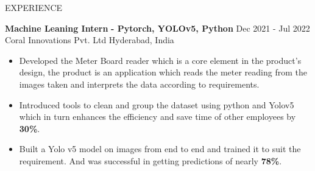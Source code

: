 \documentclass{resume} %
\begin{document}
\begin{rSection}{EXPERIENCE}

\textbf{Machine Leaning Intern} \textbf{- Pytorch, YOLOv5, Python} \hfill Dec 2021 - Jul 2022\\
Coral Innovations Pvt. Ltd  \hfill {Hyderabad, India}
 \begin{itemize}
    \itemsep -6pt {} 
     \item Developed the Meter Board reader which is a core element in the product’s design, the product is an application which reads the meter reading from the images taken and interprets the data according to requirements.
     \item Introduced tools to clean and group the dataset using python and Yolov5 which in turn enhances the efficiency and save time of other employees by \textbf{30\%}.
    \item Built a Yolo v5 model on images from end to end and trained it to suit the requirement. And was successful in getting predictions of nearly\textbf{ 78\%}.  
 \end{itemize}
 

\end{rSection} 

\end{document}
